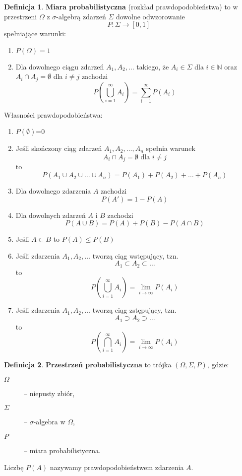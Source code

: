 \documentclass[11pt, leqno]{scrartcl}
\theoremstyle{definition}
\newtheorem{definition}{Definicja}[section]
\begin{document}
    \begin{definition}
        \textbf{Miara probabilistyczna} (rozkład prawdopodobieństwa)
        to w przestrzeni $\Omega$ z $\sigma$-algebrą zdarzeń $\Sigma$
        dowolne odwzorowanie
        \[
            P:\Sigma \to [0,1]
        \]
        spełniające warunki:
        \begin{enumerate}
            \item $P(\Omega)=1$
            \item Dla dowolnego ciągu zdarzeń $A_1,A_2,\dots$ takiego,
                że $A_i \in \Sigma$ dla $i \in \mathbb{N}$ oraz
                $A_i \cap A_j=\emptyset$ dla $i \neq j$ zachodzi
                \[
                    P\left(\bigcup_{i=1}^{\infty}A_i\right)=
                    \sum_{i=1}^{\infty}P(A_i)
                \]
        \end{enumerate}
    \end{definition}
    Własności prawdopodobieństwa:
    \begin{enumerate}
        \item $P(\emptyset)$=0
        \item Jeśli skończony ciąg zdarzeń $A_1,A_2,\dots,A_n$ spełnia
            warunek
            \[
                A_i \cap A_j = \emptyset \text{ dla }i \neq j
            \]
            to
            \[
                P(A_1 \cup A_2 \cup \dots \cup A_n)=
                P(A_1)+P(A_2)+\dots +P(A_n)
            \]
        \item Dla dowolnego zdarzenia $A$ zachodzi
            \[
                P(A')=1-P(A)
            \]
        \item Dla dowolnych zdarzeń $A$ i $B$ zachodzi
            \[
                P(A \cup B)=P(A)+P(B)-P(A \cap B)
            \]
        \item Jeśli $A \subset B$ to $P(A)\leq P(B)$
        \item Jeśli zdarzenia $A_1,A_2,\dots$ tworzą ciąg
            wstępujący, tzn.
            \[
                A_1 \subset A_2 \subset \dots
            \]
            to
            \[
                P\left( \bigcup_{i=1}^{\infty}A_i \right)=
                \lim_{i \to \infty}P(A_i)
            \]
        \item Jeśli zdarzenia $A_1,A_2,\dots$ tworzą ciąg
            zstępujący, tzn.
            \[
                A_1 \supset A_2 \supset \dots
            \]
            to
            \[
                P\left( \bigcap_{i=1}^{\infty}A_i \right)=
                \lim_{i \to \infty}P(A_i)
            \]
    \end{enumerate}
    \begin{definition}
        \textbf{Przestrzeń probabilistyczna} to trójka
        $(\Omega,\Sigma,P)$, gdzie:
        \begin{description}
            \item[$\Omega$] -- niepusty zbiór,
            \item[$\Sigma$] -- $\sigma$-algebra w $\Omega$,
            \item[$P$] -- miara probabilistyczna.
        \end{description}
    \end{definition}
    Liczbę $P(A)$ nazywamy prawdopodobieństwem zdarzenia $A$.
\end{document}
